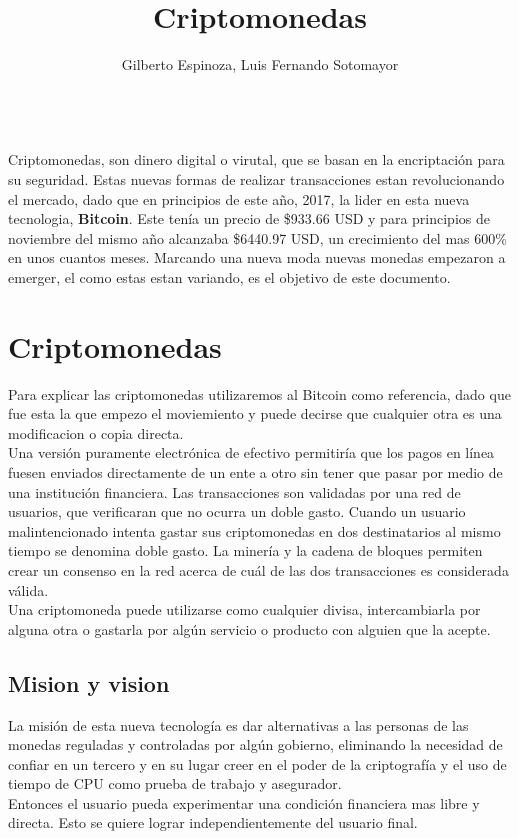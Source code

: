 \documentclass[12pt,letterpaper]{article}
\title{Criptomonedas}
\author{Gilberto Espinoza, Luis Fernando Sotomayor}
\begin{document}
\maketitle
\abstractname{\\Criptomonedas, son dinero digital o virutal, que se basan en la encriptaci\'on para su seguridad. Estas nuevas formas de realizar transacciones estan revolucionando el mercado, dado que en principios de este a\~no, 2017, la lider en esta nueva tecnologia, \textbf{Bitcoin}. Este ten\'ia un precio de \$933.66 USD y para principios de noviembre del mismo a\~no alcanzaba \$6440.97 USD, un crecimiento del mas 600\% en unos cuantos meses. Marcando una nueva moda nuevas monedas empezaron a emerger, el como estas estan variando, es el objetivo de este documento. }

\section*{Criptomonedas}
	Para explicar las criptomonedas utilizaremos al Bitcoin como referencia, dado que fue esta la que empezo el moviemiento y puede decirse que cualquier otra es una modificacion o copia directa.
    \\

	Una versi\'on puramente electr\'onica de efectivo permitir\'ia que los pagos en l\'inea fuesen enviados directamente de un ente a otro sin tener que pasar por medio de una instituci\'on financiera. Las transacciones son validadas por una red de usuarios, que verificaran que no ocurra un doble gasto. Cuando un usuario malintencionado intenta gastar sus criptomonedas en dos destinatarios al mismo tiempo se denomina doble gasto. La miner\'ia y la cadena de bloques permiten crear un consenso en la red acerca de cu\'al de las dos transacciones es considerada v\'alida.
    \\
	
	Una criptomoneda puede utilizarse como cualquier divisa, intercambiarla por alguna otra o gastarla por alg\'un servicio o producto con alguien que la acepte.
	\subsection*{Mision y vision}
	La misi\'on de esta nueva tecnolog\'ia es dar alternativas a las personas de las monedas reguladas y controladas por alg\'un gobierno, eliminando la necesidad de confiar en un tercero y en su lugar creer en el poder de la criptograf\'ia y el uso de tiempo de CPU como prueba de trabajo y asegurador. \\
    Entonces el usuario pueda experimentar una condici\'on financiera mas libre y directa. Esto se quiere lograr independientemente del usuario final.
    \\
	
\end{document}
